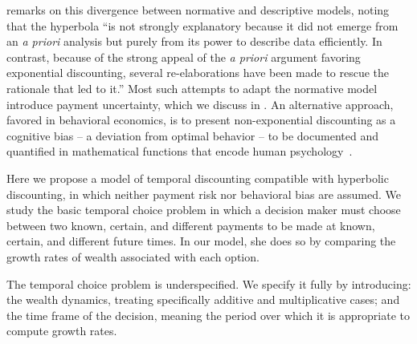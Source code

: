 \citet{Kacelnik1997} remarks on this divergence between normative and descriptive models, noting that the hyperbola ``is not strongly explanatory because it did not emerge from an {\it a priori} analysis but purely from its power to describe data efficiently. In contrast, because of the strong appeal of the {\it a priori} argument favoring exponential discounting, several re-elaborations have been made to rescue the rationale that led to it.'' Most such attempts to adapt the normative model introduce payment uncertainty, which we discuss in . An alternative approach, favored in behavioral economics, is to present non-exponential discounting as a cognitive bias -- a deviation from optimal behavior -- to be documented and quantified in mathematical functions that encode human psychology~\citep{LoewensteinPrelec1992,Laibson1997}.


Here we propose a model of temporal discounting compatible with hyperbolic discounting, in which neither payment risk nor behavioral bias are assumed. We study the basic temporal choice problem in which a decision maker must choose between two known, certain, and different payments to be made at known, certain, and different future times. In our model, she does so by comparing the growth rates of wealth associated with each option.

The temporal choice problem is underspecified. We specify it fully by introducing: the wealth dynamics, treating specifically additive and multiplicative cases; and the time frame of the decision, meaning the period over which it is appropriate to compute growth rates. 

